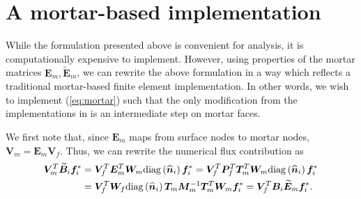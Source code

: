 \documentclass[review]{siamart0216}
\renewcommand{\tilde}{\widetilde}
\renewcommand{\hat}{\widehat}
\newcommand{\LRp}[1]{\left( #1 \right)}
\newcommand{\note}[1]{{\color{blue}{#1}}}
\newcommand{\diag}[1]{{\rm diag}\LRp{#1}}
\begin{document}
\note{Finish}

\section{A mortar-based implementation}

While the formulation presented above is convenient for analysis, it is computationally expensive to implement.  However, using properties of the mortar matrices $\bm{E}_m, \tilde{\bm{E}}_m$, we can rewrite the above formulation in a way which reflects a traditional mortar-based finite element implementation.  In other words, we wish to implement (\ref{eq:mortar}) such that the only modification from the implementations in \cite{chan2017discretely} is an intermediate step on mortar faces.  

We first note that, since $\bm{E}_m$ maps from surface nodes to mortar nodes, $\bm{V}_m = \bm{E}_m \bm{V}_f$.  Thus, we can rewrite the numerical flux contribution as
\begin{align*}
 \bm{V}_m^T\tilde{\bm{B}}_i\bm{f}_i^* &= \bm{V}_f^T \bm{E}_m^T \bm{W}_m\diag{\hat{\bm{n}}_i} \bm{f}_i^* = \bm{V}_f^T  \bm{P}_f^T\bm{T}_m^T\bm{W}_m\diag{\hat{\bm{n}}_i} \bm{f}_i^*\\
 &= \bm{V}_f^T \bm{W}_f \diag{\hat{\bm{n}}_i} \bm{T}_m\bm{M}_m^{-1}\bm{T}_m^T\bm{W}_m \bm{f}_i^* =  \bm{V}_f^T \bm{B}_i \tilde{\bm{E}}_m\bm{f}_i^*.
\end{align*}
\end{document}
